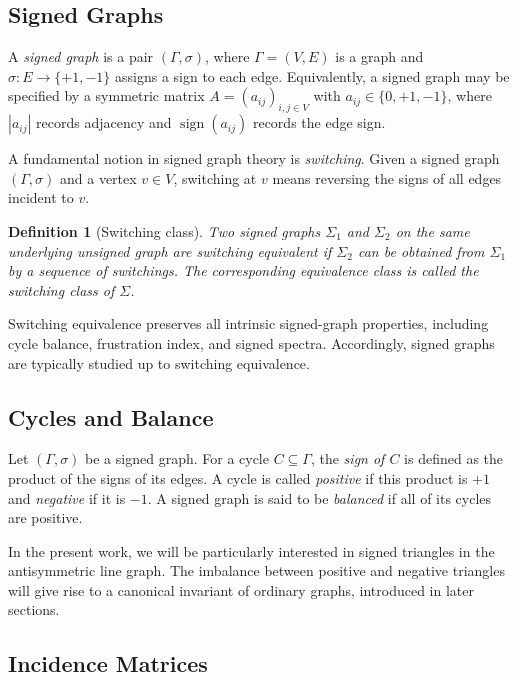 \documentclass[11pt]{article}
\newtheorem{definition}{Definition}
\theoremstyle{plain}
\begin{document}
\subsection{Signed Graphs}

A \emph{signed graph} is a pair $(\Gamma,\sigma)$, where $\Gamma=(V,E)$ is a graph
and $\sigma:E\to\{+1,-1\}$ assigns a sign to each edge.
Equivalently, a signed graph may be specified by a symmetric matrix
$A=(a_{ij})_{i,j\in V}$ with $a_{ij}\in\{0,+1,-1\}$, where $|a_{ij}|$ records
adjacency and $\operatorname{sign}(a_{ij})$ records the edge sign.

A fundamental notion in signed graph theory is \emph{switching}.
Given a signed graph $(\Gamma,\sigma)$ and a vertex $v\in V$, switching at $v$
means reversing the signs of all edges incident to $v$.

\begin{definition}[Switching class]
Two signed graphs $\Sigma_1$ and $\Sigma_2$ on the same underlying unsigned graph are
\emph{switching equivalent} if $\Sigma_2$ can be obtained from $\Sigma_1$ by a sequence of switchings.
The corresponding equivalence class is called the \emph{switching class} of $\Sigma$.
\end{definition}


Switching equivalence preserves all intrinsic signed-graph properties, including
cycle balance, frustration index, and signed spectra.
Accordingly, signed graphs are typically studied up to switching equivalence.

\subsection{Cycles and Balance}

Let $(\Gamma,\sigma)$ be a signed graph.
For a cycle $C\subseteq \Gamma$, the \emph{sign of $C$} is defined as the product
of the signs of its edges.
A cycle is called \emph{positive} if this product is $+1$ and \emph{negative} if
it is $-1$.
A signed graph is said to be \emph{balanced} if all of its cycles are positive.

In the present work, we will be particularly interested in signed triangles in
the antisymmetric line graph.
The imbalance between positive and negative triangles will give rise to a
canonical invariant of ordinary graphs, introduced in later sections.

\subsection{Incidence Matrices}
\end{document}
